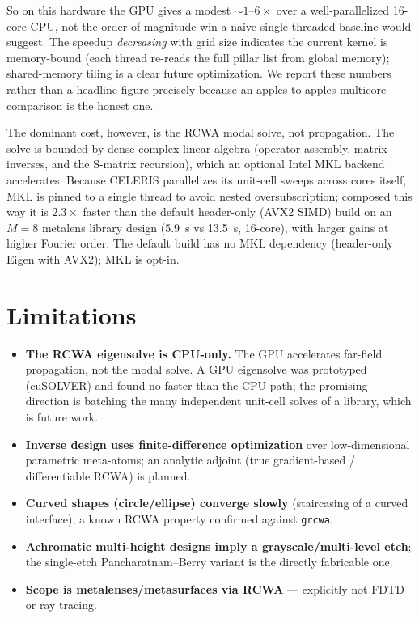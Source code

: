 \documentclass[preprint,12pt]{elsarticle}
\begin{document}
So on this hardware the GPU gives a modest ${\sim}1$--$6\times$ over a well-parallelized
16-core CPU, not the order-of-magnitude win a naive single-threaded baseline would
suggest. The speedup \emph{decreasing} with grid size indicates the current kernel is
memory-bound (each thread re-reads the full pillar list from global memory);
shared-memory tiling is a clear future optimization. We report these numbers rather than
a headline figure precisely because an apples-to-apples multicore comparison is the
honest one.

The dominant cost, however, is the RCWA modal solve, not propagation. The solve is
bounded by dense complex linear algebra (operator assembly, matrix inverses, and the
S-matrix recursion), which an optional Intel MKL backend accelerates. Because CELERIS
parallelizes its unit-cell sweeps across cores itself, MKL is pinned to a single thread
to avoid nested oversubscription; composed this way it is $2.3\times$ faster than the
default header-only (AVX2 SIMD) build on an $M=8$ metalens library design
(5.9~s vs 13.5~s, 16-core), with larger
gains at higher Fourier order. The default build has no MKL dependency (header-only
Eigen with AVX2); MKL is opt-in.

\section{Limitations}
\begin{itemize}
\item \textbf{The RCWA eigensolve is CPU-only.} The GPU accelerates far-field
      propagation, not the modal solve. A GPU eigensolve was prototyped (cuSOLVER) and
      found no faster than the CPU path; the promising direction is batching the many
      independent unit-cell solves of a library, which is future work.
\item \textbf{Inverse design uses finite-difference optimization} over low-dimensional
      parametric meta-atoms; an analytic adjoint (true gradient-based / differentiable
      RCWA) is planned.
\item \textbf{Curved shapes (circle/ellipse) converge slowly} (staircasing of a curved
      interface), a known RCWA property confirmed against \texttt{grcwa}.
\item \textbf{Achromatic multi-height designs imply a grayscale/multi-level etch}; the
      single-etch Pancharatnam--Berry variant is the directly fabricable one.
\item \textbf{Scope is metalenses/metasurfaces via RCWA} --- explicitly not FDTD or ray
      tracing.
\end{itemize}
\end{document}
